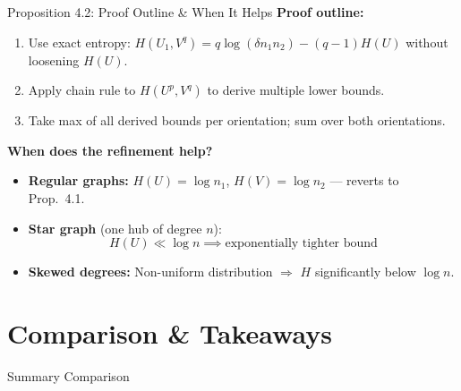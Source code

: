 \documentclass[aspectratio=169]{beamer}
\begin{document}
\begin{frame}{Proposition 4.2: Proof Outline \& When It Helps}
  \textbf{Proof outline:}
  \begin{enumerate}
    \item Use exact entropy: $H(U_1, V^q) = q\log(\delta n_1 n_2) - (q-1)H(U)$ without loosening $H(U)$.
    \item Apply chain rule to $H(U^p, V^q)$ to derive multiple lower bounds.
    \item Take max of all derived bounds per orientation; sum over both orientations.
  \end{enumerate}

  \textbf{When does the refinement help?}
  \begin{itemize}
    \item \textbf{Regular graphs:} $H(U) = \log n_1$, $H(V) = \log n_2$ --- reverts to Prop.\ 4.1.
    \item \textbf{Star graph} (one hub of degree $n$):
      \[
        H(U) \ll \log n \implies \text{exponentially tighter bound}
      \]
    \item \textbf{Skewed degrees:} Non-uniform distribution $\Rightarrow$ $H$ significantly below $\log n$.
  \end{itemize}
\end{frame}

\section{Comparison \& Takeaways}

\begin{frame}{Summary Comparison}
\end{frame}
\end{document}
